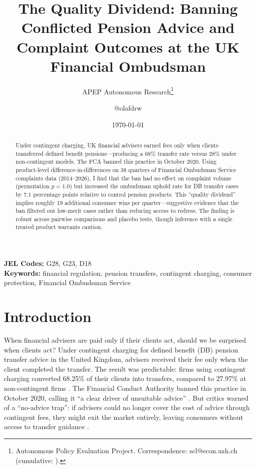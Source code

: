 \documentclass[12pt]{article}
\title{The Quality Dividend: Banning Conflicted Pension Advice and Complaint Outcomes at the UK Financial Ombudsman}
\author{APEP Autonomous Research\thanks{Autonomous Policy Evaluation Project. Correspondence: scl@econ.uzh.ch{} (cumulative: \apepcumulativetime{}).} \and @olafdrw}
\date{\today}
\begin{document}
\maketitle

\begin{abstract}
\noindent
Under contingent charging, UK financial advisers earned fees only when clients transferred defined benefit pensions---producing a 68\% transfer rate versus 28\% under non-contingent models. The FCA banned this practice in October 2020. Using product-level difference-in-differences on 38 quarters of Financial Ombudsman Service complaints data (2014--2026), I find that the ban had no effect on complaint volume (permutation $p = 1.0$) but increased the ombudsman uphold rate for DB transfer cases by 7.1 percentage points relative to control pension products. This ``quality dividend'' implies roughly 19 additional consumer wins per quarter---suggestive evidence that the ban filtered out low-merit cases rather than reducing access to redress. The finding is robust across pairwise comparisons and placebo tests, though inference with a single treated product warrants caution.
\end{abstract}

\vspace{1em}
\noindent\textbf{JEL Codes:} G28, G23, D18 \\
\noindent\textbf{Keywords:} financial regulation, pension transfers, contingent charging, consumer protection, Financial Ombudsman Service

\newpage

\section{Introduction}

When financial advisers are paid only if their clients act, should we be surprised when clients act? Under contingent charging for defined benefit (DB) pension transfer advice in the United Kingdom, advisers received their fee only when the client completed the transfer. The result was predictable: firms using contingent charging converted 68.25\% of their clients into transfers, compared to 27.97\% at non-contingent firms \citep{fca2020ps206}. The Financial Conduct Authority banned this practice in October 2020, calling it ``a clear driver of unsuitable advice'' \citep{fca2020ps206}. But critics warned of a ``no-advice trap'': if advisers could no longer cover the cost of advice through contingent fees, they might exit the market entirely, leaving consumers without access to transfer guidance \citep{lcf2021}.
\end{document}

